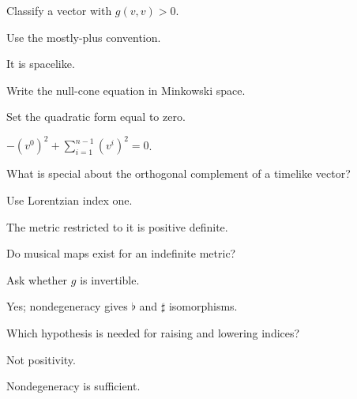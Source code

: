 \begin{exercise}\label{exr:vii29-11}
Classify a vector with \(g(v,v)>0\).
\end{exercise}
\begin{hint}
Use the mostly-plus convention.
\end{hint}
\begin{solution}
It is spacelike.
\end{solution}

\begin{exercise}\label{exr:vii29-12}
Write the null-cone equation in Minkowski space.
\end{exercise}
\begin{hint}
Set the quadratic form equal to zero.
\end{hint}
\begin{solution}
\(-(v^0)^2+\sum_{i=1}^{n-1}(v^i)^2=0\).
\end{solution}

\begin{exercise}\label{exr:vii29-13}
What is special about the orthogonal complement of a timelike vector?
\end{exercise}
\begin{hint}
Use Lorentzian index one.
\end{hint}
\begin{solution}
The metric restricted to it is positive definite.
\end{solution}

\begin{exercise}\label{exr:vii29-14}
Do musical maps exist for an indefinite metric?
\end{exercise}
\begin{hint}
Ask whether \(g\) is invertible.
\end{hint}
\begin{solution}
Yes; nondegeneracy gives \(\flat\) and \(\sharp\) isomorphisms.
\end{solution}

\begin{exercise}\label{exr:vii29-15}
Which hypothesis is needed for raising and lowering indices?
\end{exercise}
\begin{hint}
Not positivity.
\end{hint}
\begin{solution}
Nondegeneracy is sufficient.
\end{solution}

